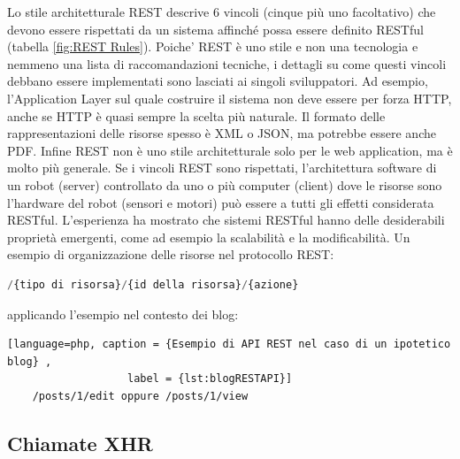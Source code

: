 Lo stile architetturale REST descrive 6 vincoli (cinque più uno facoltativo) che devono essere rispettati da un sistema affinché possa essere definito RESTful (tabella \ref{fig:REST Rules}). Poiche’ REST è uno stile e non una tecnologia e nemmeno una lista di raccomandazioni tecniche, i dettagli su come questi vincoli debbano essere implementati sono lasciati ai singoli sviluppatori. Ad esempio, l'Application Layer sul quale costruire il sistema non deve essere per forza HTTP, anche se HTTP è quasi sempre la scelta più naturale. Il formato delle rappresentazioni delle risorse spesso è XML o JSON, ma potrebbe essere anche PDF. Infine REST non è uno stile architetturale solo per le web application, ma è molto più generale. Se i vincoli REST sono rispettati, l’architettura software di un robot (server) controllato da uno o più computer (client) dove le risorse sono l’hardware del robot (sensori e motori) può essere a tutti gli effetti considerata RESTful.
L'esperienza ha mostrato che sistemi RESTful hanno delle desiderabili proprietà emergenti, come ad esempio la scalabilità e la modificabilità.
Un esempio di organizzazione delle risorse nel protocollo REST:

\begin{lstlisting}[language=php, caption = {Esempio di API REST generica}, label = {lst:genericRESTAPI}]
	/{tipo di risorsa}/{id della risorsa}/{azione}
\end{lstlisting}

applicando l'esempio nel contesto dei blog:

\begin{lstlisting}[language=php, caption = {Esempio di API REST nel caso di un ipotetico blog} , 
				   label = {lst:blogRESTAPI}]
	/posts/1/edit oppure /posts/1/view
\end{lstlisting}

\subsection{Chiamate XHR}

